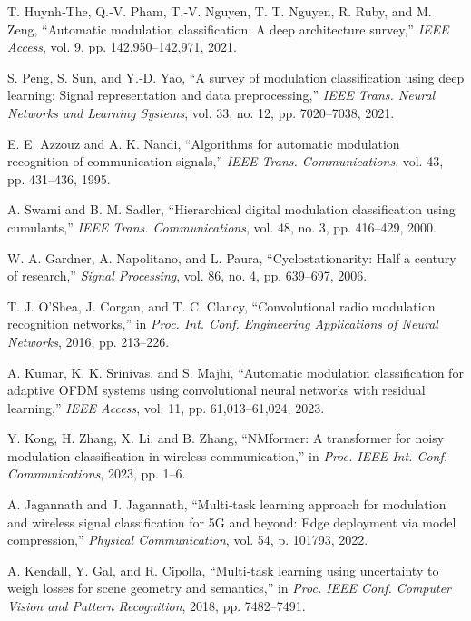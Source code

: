 \documentclass{ELSP}
\begin{document}

\begin{thebibliography}{99}

T. Huynh‑The, Q.‑V. Pham, T.‑V. Nguyen, T. T. Nguyen, R. Ruby, and M. Zeng, ``Automatic modulation classification: A deep architecture survey,'' \textit{IEEE Access}, vol. 9, pp. 142,950--142,971, 2021.

S. Peng, S. Sun, and Y.‑D. Yao, ``A survey of modulation classification using deep learning: Signal representation and data preprocessing,'' \textit{IEEE Trans. Neural Networks and Learning Systems}, vol. 33, no. 12, pp. 7020--7038, 2021.

E. E. Azzouz and A. K. Nandi, ``Algorithms for automatic modulation recognition of communication signals,'' \textit{IEEE Trans. Communications}, vol. 43, pp. 431--436, 1995.

A. Swami and B. M. Sadler, ``Hierarchical digital modulation classification using cumulants,'' \textit{IEEE Trans. Communications}, vol. 48, no. 3, pp. 416--429, 2000.

W. A. Gardner, A. Napolitano, and L. Paura, ``Cyclostationarity: Half a century of research,'' \textit{Signal Processing}, vol. 86, no. 4, pp. 639--697, 2006.

T. J. O'Shea, J. Corgan, and T. C. Clancy, ``Convolutional radio modulation recognition networks,'' in \textit{Proc. Int. Conf. Engineering Applications of Neural Networks}, 2016, pp. 213--226.

A. Kumar, K. K. Srinivas, and S. Majhi, ``Automatic modulation classification for adaptive OFDM systems using convolutional neural networks with residual learning,'' \textit{IEEE Access}, vol. 11, pp. 61,013--61,024, 2023.

Y. Kong, H. Zhang, X. Li, and B. Zhang, ``NMformer: A transformer for noisy modulation classification in wireless communication,'' in \textit{Proc. IEEE Int. Conf. Communications}, 2023, pp. 1--6.

A. Jagannath and J. Jagannath, ``Multi‑task learning approach for modulation and wireless signal classification for 5G and beyond: Edge deployment via model compression,'' \textit{Physical Communication}, vol. 54, p. 101793, 2022.

A. Kendall, Y. Gal, and R. Cipolla, ``Multi‑task learning using uncertainty to weigh losses for scene geometry and semantics,'' in \textit{Proc. IEEE Conf. Computer Vision and Pattern Recognition}, 2018, pp. 7482--7491.


\end{thebibliography}
\end{document}
